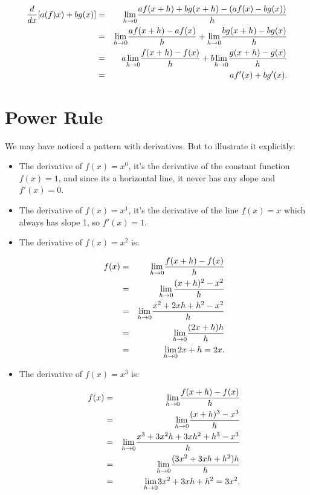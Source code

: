 \begin{eqnarray*}
\frac{d}{dx}[a(f)x)+bg(x)]&=&\displaystyle{ \lim_{h \to 0}}\frac{af(x+h)+bg(x+h)-(af(x)-bg(x))}{h}\\
&=&\displaystyle{ \lim_{h \to 0}}\frac{af(x+h)-af(x)}{h}+\displaystyle{ \lim_{h \to 0}}\frac{bg(x+h)-bg(x)}{h}\\
&=&a\displaystyle{ \lim_{h \to 0}}\frac{f(x+h)-f(x)}{h}+b\displaystyle{ \lim_{h \to 0}}\frac{g(x+h)-g(x)}{h}\\
&=&af'(x)+bg'(x).
\end{eqnarray*}

\section{Power Rule}\label{Section:PowerRule}

We may have noticed a pattern with derivatives.  But to illustrate it explicitly:

\begin{itemize}
\item The derivative of $f(x)=x^0$, it's the derivative of the  constant function $f(x)=1$, and since its a horizontal line, it never has any slope and $f'(x)=0$.
\item  The derivative of $f(x)=x^1$, it's the derivative of the line $f(x)=x$ which always has slope 1, so $f'(x)=1$.

\item The derivative of $f(x)=x^2$ is:

\begin{eqnarray*}
f(x)&=&\displaystyle{ \lim_{h \to 0}}\frac{f(x+h)-f(x)}{h}\\
&=&\displaystyle{ \lim_{h \to 0}} \frac{(x+h)^2-x^2}{h}\\
&=&\displaystyle{ \lim_{h \to 0}} \frac{x^2+2xh+h^2-x^2}{h}\\
&=&\displaystyle{ \lim_{h \to 0}} \frac{(2x+h)h}{h}\\
&=&\displaystyle{ \lim_{h \to 0}} 2x+h=2x.\\
\end{eqnarray*}


\item The derivative of $f(x)=x^3$ is:

\begin{eqnarray*}
f(x)&=&\displaystyle{ \lim_{h \to 0}}\frac{f(x+h)-f(x)}{h}\\
&=&\displaystyle{ \lim_{h \to 0}} \frac{(x+h)^3-x^3}{h}\\
&=&\displaystyle{ \lim_{h \to 0}} \frac{x^3+3x^2h+3xh^2+h^3-x^3}{h}\\
&=&\displaystyle{ \lim_{h \to 0}} \frac{(3x^2+3xh+h^2)h}{h}\\
&=&\displaystyle{ \lim_{h \to 0}} 3x^2+3xh+h^2=3x^2.\\
\end{eqnarray*}
 
\end{itemize}

